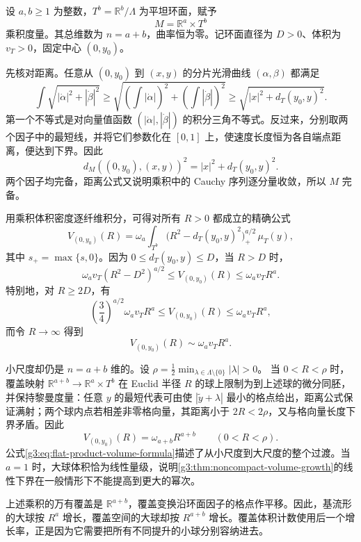 \begin{example}\label{g3:exm:flat-product-volume-growth}
	设 \(a,b\ge1\) 为整数，\(T^b=\mathbb R^b/\Lambda\) 为平坦环面，赋予
	\[
		M=\mathbb R^a\times T^b
	\]
	乘积度量。其总维数为 \(n=a+b\)，曲率恒为零。记环面直径为 \(D>0\)、体积为 \(v_T>0\)，固定中心 \((0,y_0)\)。

	先核对距离。任意从 \((0,y_0)\) 到 \((x,y)\) 的分片光滑曲线 \((\alpha,\beta)\) 都满足
	\[
		\int\sqrt{|\dot\alpha|^2+|\dot\beta|^2}
		\ge
		\sqrt{\left(\int|\dot\alpha|\right)^2+
		\left(\int|\dot\beta|\right)^2}
		\ge\sqrt{|x|^2+d_T(y_0,y)^2}.
	\]
	第一个不等式是对向量值函数
	\((|\dot\alpha|,|\dot\beta|)\) 的积分三角不等式。反过来，分别取两个因子中的最短线，并将它们参数化在 \([0,1]\) 上，使速度长度恒为各自端点距离，便达到下界。因此
	\[
		d_M((0,y_0),(x,y))^2=|x|^2+d_T(y_0,y)^2.
	\]
	两个因子均完备，距离公式又说明乘积中的 Cauchy 序列逐分量收敛，所以 \(M\) 完备。

	用乘积体积密度逐纤维积分，可得对所有 \(R>0\) 都成立的精确公式
	\begin{equation}\label{g3:eq:flat-product-volume-formula}
		V_{(0,y_0)}(R)
		=\omega_a\int_{T^b}
		\bigl(R^2-d_T(y_0,y)^2\bigr)_+^{a/2}\,\mu_T(y),
	\end{equation}
	其中 \(s_+=\max\{s,0\}\)。因为 \(0\le d_T(y_0,y)\le D\)，当 \(R>D\) 时，
	\begin{equation}\label{g3:eq:flat-product-volume-bounds}
		\omega_av_T(R^2-D^2)^{a/2}
		\le V_{(0,y_0)}(R)
		\le\omega_av_TR^a.
	\end{equation}
	特别地，对 \(R\ge2D\)，有
	\[
		\left(\frac34\right)^{a/2}\omega_av_TR^a
		\le V_{(0,y_0)}(R)
		\le\omega_av_TR^a,
	\]
	而令 \(R\to\infty\) 得到
	\[
		V_{(0,y_0)}(R)\sim\omega_av_TR^a.
	\]

	小尺度却仍是 \(n=a+b\) 维的。设
	\(\rho=\frac12\min_{\lambda\in\Lambda\setminus\{0\}}|\lambda|>0\)。
	当 \(0<R<\rho\) 时，覆盖映射
	\(\mathbb R^{a+b}\to\mathbb R^a\times T^b\)
	在 Euclid 半径 \(R\) 的球上限制为到上述球的微分同胚，并保持黎曼度量：任意 \(y\) 的最短代表可由使 \(|\widetilde y+\lambda|\) 最小的格点给出，距离公式保证满射；两个球内点若相差非零格向量，其距离小于 \(2R<2\rho\)，又与格向量长度下界矛盾。因此
	\[
		V_{(0,y_0)}(R)=\omega_{a+b}R^{a+b}
		\qquad(0<R<\rho).
	\]
	公式\eqref{g3:eq:flat-product-volume-formula}描述了从小尺度到大尺度的整个过渡。当 \(a=1\) 时，大球体积恰为线性量级，说明\cref{g3:thm:noncompact-volume-growth}的线性下界在一般情形下不能提高到更大的幂次。
\end{example}

上述乘积的万有覆盖是 \(\mathbb R^{a+b}\)，覆盖变换沿环面因子的格点作平移。因此，基流形的大球按 \(R^a\) 增长，覆盖空间的大球却按 \(R^{a+b}\) 增长。覆盖体积计数使用后一个增长率，正是因为它需要把所有不同提升的小球分别容纳进去。
